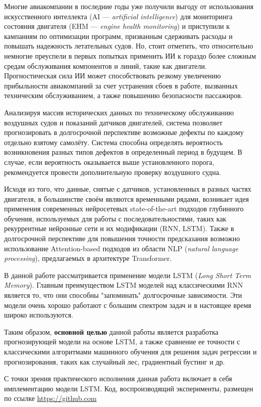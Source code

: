 \documentclass[14pt]{extarticle}
\begin{document}
Многие авиакомпании в последние годы уже получили выгоду от использования искусственного интеллекта (AI --- {\it artificial intelligence}) для мониторинга состояния двигателя (EHM --- {\it engine health monitoring}) и приступили к кампаниям по оптимизации программ, призванным сдерживать расходы и повышать надежность летательных судов. Но, стоит отметить, что относительно немногие преуспели в первых попытках применить ИИ к гораздо более сложным средам обслуживания компонентов и линий, такие как двигатели. Прогностическая сила ИИ может способствовать резкому увеличению прибыльности авиакомпаний за счет устранения сбоев в работе, вызванных техническим обслуживанием, а также повышению безопасности пассажиров.

Анализируя массив исторических данных по техническому обслуживанию воздушных судов и показаний датчиков двигателей, система позволяет прогнозировать в долгосрочной перспективе возможные дефекты по каждому отдельно взятому самолёту. Система способна определять вероятность возникновения разных типов дефектов в определенный период в будущем. В случае, если вероятность оказывается выше установленного порога, рекомендуется провести дополнительную проверку воздушного судна.

Исходя из того, что данные, снятые с датчиков, установленных в разных частях двигателя, в большинстве своём являются временными рядами, возникает идея применения современных нейросетевых state-of-the-art подходов глубинного обучения, используемых для работы с последовательностями, таких как рекуррентные нейронные сети и их модификации (RNN, LSTM). Также в долгосрочной перспективе для повышения точности предсказания возможно использование Attention-based подходов из области NLP ({\it natural language processing}), предлагаемых в архитектуре Transformer.

В данной работе рассматривается применение модели LSTM ({\it Long Short Term Memory}). Главным преимуществом LSTM моделей над классическими RNN является то, что они способны "запоминать" долгосрочные зависимости. Эти модели очень хорошо работают с большим спектром задач и в настоящее время широко используются.

Таким образом, {\bf основной целью} данной работы является разработка прогнозирующей модели на основе LSTM, а также сравнение ее точности с классическими алгоритмами машинного обучения для решения задач регрессии и прогнозирования, таких как случайный лес, градиентный бустинг и др. 

С точки зрения практического исполнения данная работа включает в себя имплементацию модели LSTM. Код, воспроизводящий эксперименты, размещен по ссылке \href{https://github.com}{https://github.com}
\end{document}
